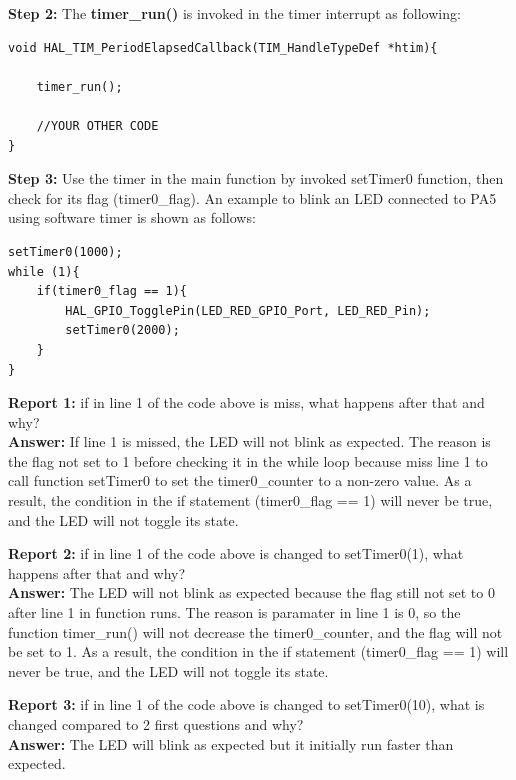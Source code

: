 \documentclass[twoside, final]{hcmut_report}
\begin{document}
\textbf{Step 2: } The \textbf{timer\_run()} is invoked in the timer interrupt as following:

\begin{lstlisting}[caption=Software timer based timer interrupt]
void HAL_TIM_PeriodElapsedCallback(TIM_HandleTypeDef *htim){
	
	timer_run();
	
	//YOUR OTHER CODE
}
\end{lstlisting}

\textbf{Step 3: } Use the timer in the main function by invoked setTimer0 function, then check for its flag (timer0\_flag). An example to blink an LED connected to PA5 using software timer is shown as follows:
\begin{lstlisting}[caption=Software timer is used in main fuction to blink the LED]
setTimer0(1000);
while (1){
    if(timer0_flag == 1){
        HAL_GPIO_TogglePin(LED_RED_GPIO_Port, LED_RED_Pin);
        setTimer0(2000);
    }
}
\end{lstlisting}

\textbf{Report 1: } if in line 1 of the code above is miss, what happens after that and why?\\

\textbf{Answer: } If line 1 is missed, the LED will not blink as expected. The reason is the flag not set to 1 before checking it in the while loop because miss line 1 to call function setTimer0 to set the timer0\_counter to a non-zero value. As a result, the condition in the if statement (timer0\_flag == 1) will never be true, and the LED will not toggle its state.

\textbf{Report 2: } if in line 1 of the code above is changed to setTimer0(1), what happens after that and why?\\

\textbf{Answer: } The LED will not blink as expected because the flag still not set to 0 after line 1 in function runs. The reason is paramater in line 1 is 0, so the function timer\_run() will not decrease the timer0\_counter, and the flag will not be set to 1. As a result, the condition in the if statement (timer0\_flag == 1) will never be true, and the LED will not toggle its state.

\textbf{Report 3: } if in line 1 of the code above is changed to setTimer0(10), what is changed compared to 2 first questions and why?\\

\textbf{Answer: } The LED will blink as expected but it initially run faster than expected.
\end{document}
